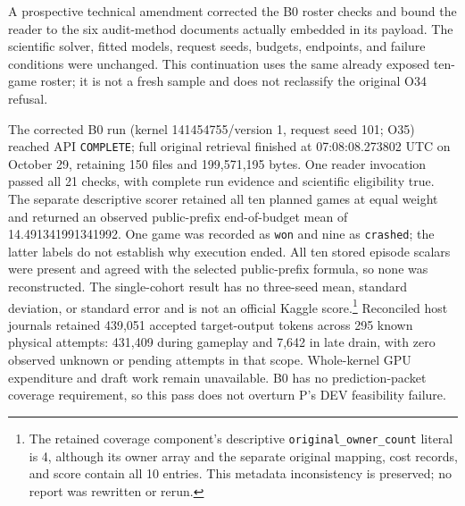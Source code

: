 \documentclass[11pt]{article}
\begin{document}
A prospective technical amendment corrected the B0 roster checks and bound the reader to the six audit-method documents actually embedded in its payload. The scientific solver, fitted models, request seeds, budgets, endpoints, and failure conditions were unchanged. This continuation uses the same already exposed ten-game roster; it is not a fresh sample and does not reclassify the original O34 refusal.

The corrected B0 run (kernel 141454755/version 1, request seed 101; O35) reached API \texttt{COMPLETE}; full original retrieval finished at 07:08:08.273802 UTC on October 29, retaining 150 files and 199,571,195 bytes. One reader invocation passed all 21 checks, with complete run evidence and scientific eligibility true. The separate descriptive scorer retained all ten planned games at equal weight and returned an observed public-prefix end-of-budget mean of 14.491341991341992. One game was recorded as \texttt{won} and nine as \texttt{crashed}; the latter labels do not establish why execution ended. All ten stored episode scalars were present and agreed with the selected public-prefix formula, so none was reconstructed. The single-cohort result has no three-seed mean, standard deviation, or standard error and is not an official Kaggle score.\footnote{The retained coverage component's descriptive \texttt{original\_owner\_count} literal is 4, although its owner array and the separate original mapping, cost records, and score contain all 10 entries. This metadata inconsistency is preserved; no report was rewritten or rerun.} Reconciled host journals retained 439,051 accepted target-output tokens across 295 known physical attempts: 431,409 during gameplay and 7,642 in late drain, with zero observed unknown or pending attempts in that scope. Whole-kernel GPU expenditure and draft work remain unavailable. B0 has no prediction-packet coverage requirement, so this pass does not overturn P's DEV feasibility failure.
\end{document}
